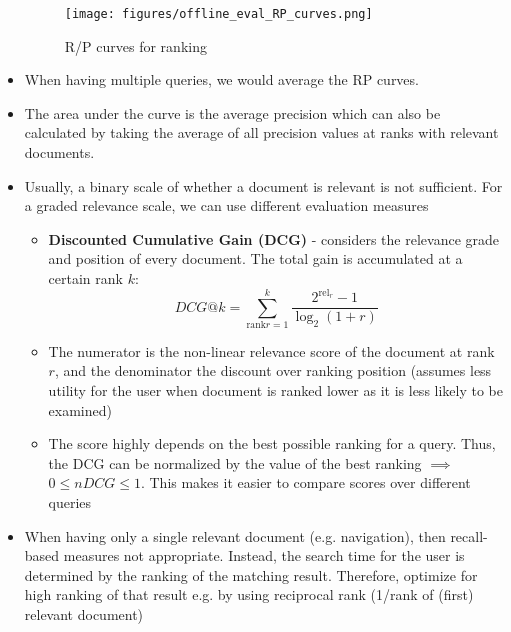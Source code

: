 \begin{itemize}
	\begin{figure}[ht]
		\centering
		\texttt{[image: figures/offline\_eval\_RP\_curves.png]}
		\caption{R/P curves for ranking}
		\label{img:offline_eval_RP_curves}
	\end{figure}
	\item When having multiple queries, we would average the RP curves. 
	\item The area under the curve is the average precision which can also be calculated by taking the average of all precision values at ranks with relevant documents.
	\item Usually, a binary scale of whether a document is relevant is not sufficient. For a graded relevance scale, we can use different evaluation measures
	\begin{itemize}
		\item \textbf{Discounted Cumulative Gain (DCG)} - considers the relevance grade and position of every document. The total gain is accumulated at a certain rank $k$:
		$$DCG@k = \sum\limits_{\text{rank} r=1}^{k} \frac{2^{\text{rel}_r} - 1}{\log_2\left(1 + r\right)}$$
		\item The numerator is the non-linear relevance score of the document at rank $r$, and the denominator the discount over ranking position (assumes less utility for the user when document is ranked lower as it is less likely to be examined)
		\item The score highly depends on the best possible ranking for a query. Thus, the DCG can be normalized by the value of the best ranking $\implies$ $0\leq nDCG \leq 1$. This makes it easier to compare scores over different queries
	\end{itemize}
	\item When having only a single relevant document (e.g. navigation), then recall-based measures not appropriate. Instead, the search time for the user is determined by the ranking of the matching result. Therefore, optimize for high ranking of that result e.g. by using reciprocal rank (1/rank of (first) relevant document)
\end{itemize}
